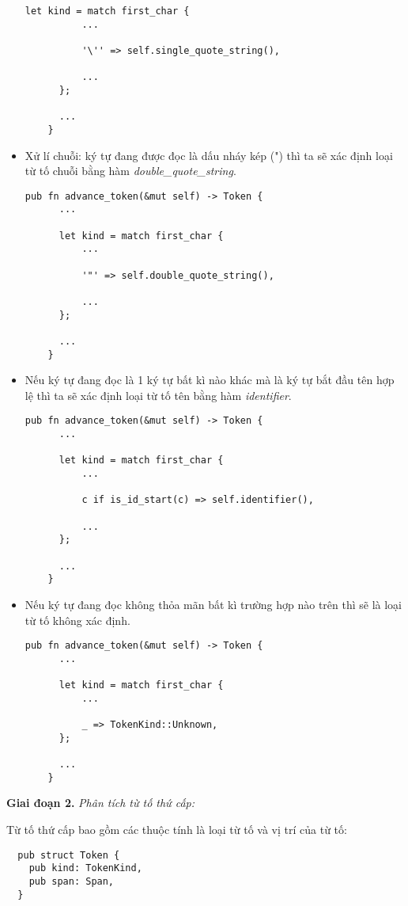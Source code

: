 \begin{itemize}
\begin{lstlisting}[]
      let kind = match first_char {
          ...
  
          '\'' => self.single_quote_string(),
 
          ...
      };
  
      ...
    } 
  \end{lstlisting}
  \item Xử lí chuỗi: ký tự đang được đọc là dấu nháy kép (") thì ta sẽ xác định loại từ tố chuỗi bằng hàm \textit{double\_quote\_string}. 
  \begin{lstlisting}[]
    pub fn advance_token(&mut self) -> Token {
      ...
  
      let kind = match first_char {
          ...
  
          '"' => self.double_quote_string(),
  
          ...
      };
  
      ...
    } 
  \end{lstlisting}
  \item Nếu ký tự đang đọc là 1 ký tự bất kì nào khác mà là ký tự bắt đầu tên hợp lệ thì ta sẽ xác định loại từ tố tên bằng hàm \textit{identifier}. 
  \begin{lstlisting}[]
    pub fn advance_token(&mut self) -> Token {
      ...
  
      let kind = match first_char {
          ...
  
          c if is_id_start(c) => self.identifier(),
  
          ...
      };
  
      ...
    } 
  \end{lstlisting}
  \item Nếu ký tự đang đọc không thỏa mãn bất kì trường hợp nào trên thì sẽ là loại từ tố không xác định.
  \begin{lstlisting}[]
    pub fn advance_token(&mut self) -> Token {
      ...
  
      let kind = match first_char {
          ...
  
          _ => TokenKind::Unknown,
      };
  
      ...
    } 
  \end{lstlisting}
\end{itemize}


\textbf{Giai đoạn 2.} \textit{Phân tích từ tố thứ cấp:}

Từ tố thứ cấp bao gồm các thuộc tính là loại từ tố và vị trí của từ tố:
\begin{lstlisting}
  pub struct Token {
    pub kind: TokenKind,
    pub span: Span,
  }
\end{lstlisting}

